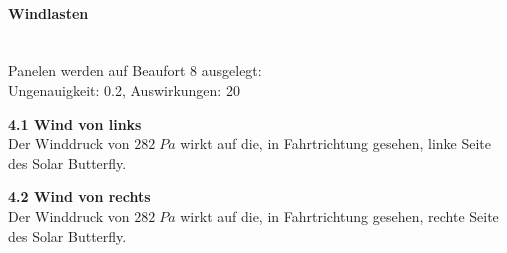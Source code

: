 \paragraph{Windlasten}\mbox{}\\
Panelen werden auf Beaufort 8 ausgelegt:\\
Ungenauigkeit: 0.2, Auswirkungen: 20
\begin{description}
  \item \textbf{4.1 Wind von links}\\ Der Winddruck von $282 \; Pa$ wirkt auf die, in Fahrtrichtung gesehen, linke Seite des Solar Butterfly.
  \item \textbf{4.2 Wind von rechts}\\ Der Winddruck von $282 \; Pa$ wirkt auf die, in Fahrtrichtung gesehen, rechte Seite des Solar Butterfly.
\end{description}


